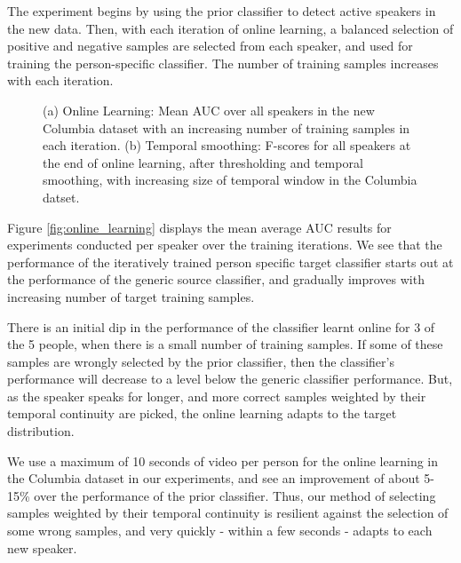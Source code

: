 \documentclass[runningheads]{llncs}
\begin{document}
The experiment begins by using the prior classifier to detect active speakers in the new data. Then, with each iteration of online learning, a balanced selection of positive and negative samples are selected from each speaker, and used for training the person-specific classifier. The number of training samples increases with each iteration.

\begin{figure}[t]
\vspace*{-0.4cm} 
  \centering
  \hfill
     \caption{(a) Online Learning: Mean AUC over all speakers in the new Columbia dataset with an increasing number of training samples in each iteration. (b) Temporal smoothing: F-scores for all speakers at the end of online learning, after thresholding and temporal smoothing, with increasing size of temporal window in the Columbia datset.}
\vspace*{-0.8cm} 
\end{figure}

Figure \ref{fig:online_learning} displays the mean average AUC results for experiments conducted per speaker over the training iterations. We see that the performance of the iteratively trained person specific target classifier starts out at the performance of the generic source classifier, and gradually improves with increasing number of target training samples.

There is an initial dip in the performance of the classifier learnt online for 3 of the 5 people, when there is a small number of training samples. If some of these samples are wrongly selected by the prior classifier, 
then the classifier's performance will decrease to a level below the generic classifier performance. But, as the speaker speaks for longer, and more correct samples weighted by their temporal continuity are picked, the online learning adapts to the target distribution. 

We use a maximum of 10 seconds of video per person for the online learning in the Columbia dataset in our experiments, and see an improvement of about 5-15\% over the performance of the prior classifier. Thus, our method of selecting samples weighted by their temporal continuity is resilient against the selection of some wrong samples, and very quickly - within a few seconds - adapts to each new speaker.
\end{document}
